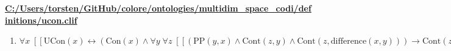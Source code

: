 \documentclass{article}
\begin{document}
\textbf{\url{C:/Users/torsten/GitHub/colore/ontologies/multidim\_space\_codi/definitions/ucon.clif}}

\begin{enumerate}
\item $\forall x\;  \left[ \left[ \textrm{UCon}(x) \leftrightarrow \left(\textrm{Con}(x) \land \forall y\; \forall z\;  \left[ \left[ \left(\textrm{PP}(y,x) \land \textrm{Cont}(z,y) \land \textrm{Cont}(z,\textrm{difference}(x,y))\right) \rightarrow \textrm{Cont}(z,\textrm{intersection}(y,\textrm{difference}(x,y))) \right] \right]\right) \right] \right]$
\end{enumerate}
\end{document}
